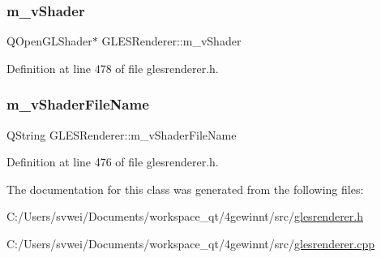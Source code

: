 \subsubsection{\texorpdfstring{m\_vShader}{m\_vShader}}
{\footnotesize\ttfamily Q\+Open\+G\+L\+Shader$\ast$ G\+L\+E\+S\+Renderer\+::m\+\_\+v\+Shader\hspace{0.3cm}{\ttfamily [protected]}}



Definition at line 478 of file glesrenderer.\+h.

\mbox{\label{class_g_l_e_s_renderer_a9f9222c1a54ff9b01edb609bb570151a}} 
\subsubsection{\texorpdfstring{m\_vShaderFileName}{m\_vShaderFileName}}
{\footnotesize\ttfamily Q\+String G\+L\+E\+S\+Renderer\+::m\+\_\+v\+Shader\+File\+Name\hspace{0.3cm}{\ttfamily [protected]}}



Definition at line 476 of file glesrenderer.\+h.



The documentation for this class was generated from the following files\+:\begin{DoxyCompactItemize}
\item 
C\+:/\+Users/svwei/\+Documents/workspace\+\_\+qt/4gewinnt/src/\mbox{\hyperlink{glesrenderer_8h}{glesrenderer.\+h}}\item 
C\+:/\+Users/svwei/\+Documents/workspace\+\_\+qt/4gewinnt/src/\mbox{\hyperlink{glesrenderer_8cpp}{glesrenderer.\+cpp}}\end{DoxyCompactItemize}
